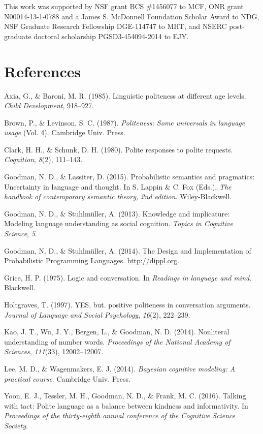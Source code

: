 \documentclass[10pt, letterpaper]{article}
\begin{document}
This work was supported by NSF grant BCS \#1456077 to MCF, ONR grant
N00014-13-1-0788 and a James S. McDonnell Foundation Scholar Award to
NDG, NSF Graduate Research Fellowship DGE-114747 to MHT, and NSERC
post-graduate doctoral scholarship PGSD3-454094-2014 to EJY.

\section{References}\label{references}

\setlength{\parindent}{-0.1in} \setlength{\leftskip}{0.125in} \noindent

\hypertarget{refs}{}
\hypertarget{ref-axia1985}{}
Axia, G., \& Baroni, M. R. (1985). Linguistic politeness at different
age levels. \emph{Child Development}, 918--927.

\hypertarget{ref-Brown1987}{}
Brown, P., \& Levinson, S. C. (1987). \emph{Politeness: Some universals
in language usage} (Vol. 4). Cambridge Univ. Press.

\hypertarget{ref-clark1980}{}
Clark, H. H., \& Schunk, D. H. (1980). Polite responses to polite
requests. \emph{Cognition}, \emph{8}(2), 111--143.

\hypertarget{ref-GoodmanLassiter2015}{}
Goodman, N. D., \& Lassiter, D. (2015). Probabilistic semantics and
pragmatics: Uncertainty in language and thought. In S. Lappin \& C. Fox
(Eds.), \emph{The handbook of contemporary semantic theory, 2nd
edition}. Wiley-Blackwell.

\hypertarget{ref-Goodman2013}{}
Goodman, N. D., \& Stuhlmüller, A. (2013). Knowledge and implicature:
Modeling language understanding as social cognition. \emph{Topics in
Cognitive Science}, \emph{5}.

\hypertarget{ref-dippl}{}
Goodman, N. D., \& Stuhlmüller, A. (2014). The Design and Implementation
of Probabilistic Programming Languages. \url{http://dippl.org}.

\hypertarget{ref-Grice1975}{}
Grice, H. P. (1975). Logic and conversation. In \emph{Readings in
language and mind}. Blackwell.

\hypertarget{ref-holtgraves1997}{}
Holtgraves, T. (1997). YES, but. positive politeness in conversation
arguments. \emph{Journal of Language and Social Psychology},
\emph{16}(2), 222--239.

\hypertarget{ref-Kao2014}{}
Kao, J. T., Wu, J. Y., Bergen, L., \& Goodman, N. D. (2014). Nonliteral
understanding of number words. \emph{Proceedings of the National Academy
of Sciences}, \emph{111}(33), 12002--12007.

\hypertarget{ref-LW2014}{}
Lee, M. D., \& Wagenmakers, E. J. (2014). \emph{Bayesian cognitive
modeling: A practical course}. Cambridge Univ. Press.

\hypertarget{ref-yoon2016}{}
Yoon, E. J., Tessler, M. H., Goodman, N. D., \& Frank, M. C. (2016).
Talking with tact: Polite language as a balance between kindness and
informativity. In \emph{Proceedings of the thirty-eighth annual
conference of the Cognitive Science Society}.
\end{document}
